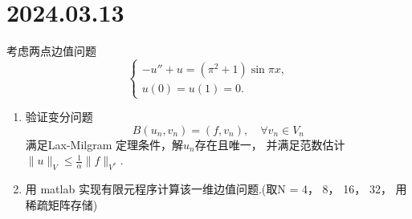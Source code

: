 \documentclass[12pt,a4paper]{article}
\begin{document}
	
	\noindent
	
	\section{2024.03.13}	
	
	
	考虑两点边值问题
	\begin{equation}
		\left\{
		\begin{array}{l}
			-u'' + u = (\pi^2 +1) \sin{\pi x}, \\
			u(0) = u(1) = 0.
		\end{array}
		\right.
	\end{equation}
	
	\begin{enumerate}
		
		\item 验证变分问题 $$B(u_n, v_n) = (f, v_n),\quad \forall v_n \in V_n$$ 满足Lax-Milgram 定理条件，解$u_n$存在且唯一， 并满足范数估计 $\|u\|_V \leq \frac{1}{\alpha} \|f\|_{V^*} $.
		
		\item 用 matlab 实现有限元程序计算该一维边值问题.(取N = 4， 8， 16， 32， 用稀疏矩阵存储)
		
		
	\end{enumerate}
	
	
\end{document}
